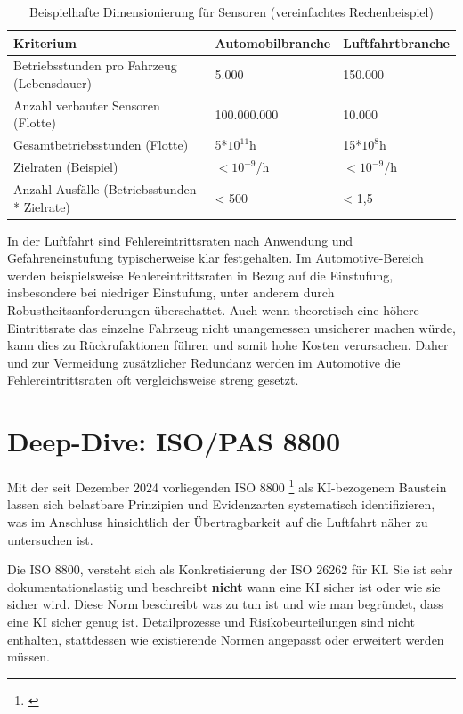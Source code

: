 \begin{table}[H]
\centering
\caption{Beispielhafte Dimensionierung für Sensoren (vereinfachtes Rechenbeispiel)}
  \begin{tabular}{p{} p{} p{}}
\toprule
\textbf{Kriterium} & \textbf{Automobilbranche} & \textbf{Luftfahrtbranche} \\
\midrule
  Betriebsstunden pro Fahrzeug (Lebensdauer) & 5.000  & 150.000 \\
  Anzahl verbauter Sensoren (Flotte) & 100.000.000 & 10.000 \\
  Gesamtbetriebsstunden (Flotte) & 5*$10^{11}$h & 15*$10^{8}$h  \\
  Zielraten (Beispiel) & $<10^{-9}$/h &  $<10^{-9}$/h \\
  Anzahl Ausfälle (Betriebsstunden * Zielrate) & < 500 &  < 1{,}5 \\
\bottomrule
\end{tabular}
\end{table}


In der Luftfahrt sind Fehlereintrittsraten nach Anwendung und Gefahreneinstufung typischerweise klar festgehalten. 
Im Automotive-Bereich werden beispielsweise Fehlereintrittsraten in Bezug auf die Einstufung, insbesondere bei niedriger 
Einstufung, unter anderem durch Robustheitsanforderungen überschattet. Auch wenn theoretisch eine höhere Eintrittsrate das einzelne Fahrzeug 
nicht unangemessen unsicherer machen würde, kann dies zu Rückrufaktionen führen und somit hohe Kosten verursachen. 
Daher und zur Vermeidung zusätzlicher Redundanz werden im Automotive die Fehlereintrittsraten oft vergleichsweise streng gesetzt. 














\chapter{Deep-Dive: ISO/PAS 8800}\label{chap:iso-8800}
Mit der seit Dezember 2024 vorliegenden ISO 8800 \footnote{ \parencite{iso-pas-8800-2024}} 
als KI-bezogenem Baustein lassen sich belastbare 
Prinzipien und Evidenzarten systematisch identifizieren, was im Anschluss hinsichtlich der 
Übertragbarkeit auf die Luftfahrt näher zu untersuchen ist.

Die ISO 8800, versteht sich als Konkretisierung der ISO 26262 für KI.
Sie ist sehr dokumentationslastig und beschreibt \textbf{nicht} wann eine KI sicher ist oder wie sie 
sicher wird. Diese Norm beschreibt was zu tun ist und wie man begründet, dass eine KI sicher genug ist. 
Detailprozesse und Risikobeurteilungen sind nicht enthalten, stattdessen wie existierende Normen 
angepasst oder erweitert werden müssen.


